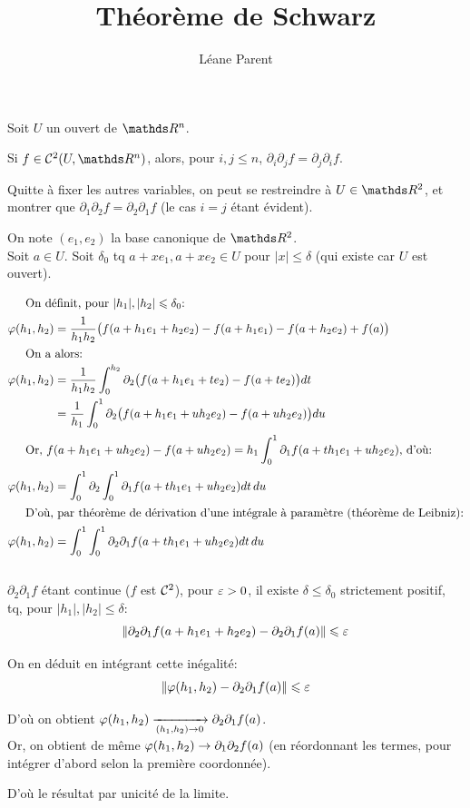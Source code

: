 \documentclass[a4paper, 12pt]{article}
\title{Théorème de Schwarz}
\author{Léane Parent}
\begin{document}
	\maketitle
	
	\begin{pr}
		Soit $U$ un ouvert de $\R^n$.
		
		Si $f \in \Co[2](U, \R^n)$, alors, pour $i, j \leqslant n$, $\partial_i \partial_j f = \partial_j \partial_i f$.
	\end{pr}
	
	Quitte à fixer les autres variables, on peut se restreindre à $U \in \R^2$, et montrer que $\partial_1 \partial_2 f = \partial_2 \partial_1 f$ (le cas $i=j$ étant évident).
	
	On note $(e_1, e_2)$ la base canonique de $\R^2$. \\
	
	Soit $a\in U$. Soit $\delta_0$ tq $a+xe_1, a+xe_2 \in U$ pour $|x| \leqslant \delta$ (qui existe car $U$ est ouvert).
	
	\begin{align*}
		\shortintertext{\indent On définit, pour $|h_1|, |h_2| \leqslant \delta_0$:}
		\vphi(h_1, h_2) &=\frac 1 {h_1h_2} \big( f(a+h_1e_1 + h_2e_2) - f(a+h_1e_1) - f(a+h_2 e_2) + f(a) \big) \\ 
		\shortintertext{\indent On a alors:}
		\vphi(h_1, h_2) & = \frac 1 {h_1 h_2} \int_0^{h_2} \partial_2 \big( f(a+h_1e_1 + te_2) - f(a+te_2)\big) dt \\
		& = \frac 1 {h_1} \int_0^1 \partial_2 \big(f(a+h_1e_1 + uh_2e_2) - f(a+uh_2e_2)\big) du \\
		\shortintertext{\indent Or, $ \displaystyle f(a+h_1e_1 + uh_2e_2) - f(a+uh_2e_2) = h_1 \int_0^1 \partial_1 f(a+th_1e_1 + uh_2e_2)$, d'où:}
		\vphi(h_1, h_2) &= \int_0^1 \partial_2 \int_0^1 \partial_1 f(a+th_1e_1 + uh_2e_2) dt\, du\\
		\shortintertext{\indent D'où, par théorème de dérivation d'une intégrale à paramètre (théorème de Leibniz):}
		\vphi(h_1, h_2) &= \int_0^1 \int_0^1 \partial_2 \partial_1 f(a+th_1e_1 + uh_2e_2) dt\, du
	\end{align*}
	\hfill \\
	
	$\partial_2\partial_1 f$ étant continue ($f$ est $\Co[2]$), pour $\varepsilon > 0$, il existe $\delta \leqslant \delta_0$ strictement positif, tq, pour $|h_1|, |h_2| \leqslant \delta$:
	$$\norm[\partial_2 \partial_1 f(a+h_1e_1 + h_2e_2) - \partial_2 \partial_1 f(a)] \leqslant \eps$$
	
	On en déduit en intégrant cette inégalité:
	$$ \norm[\vphi(h_1, h_2) - \partial_2 \partial_1 f(a)] \leqslant \eps $$
	
	D'où on obtient $ \vphi(h_1, h_2) \cv[(h_1, h_2) \rightarrow 0] \partial_2 \partial_1 f(a) $. \\
	
	Or, on obtient de même $\vphi(h_1, h_2) \cv \partial_1 \partial_2 f(a)$ (en réordonnant les termes, pour intégrer d'abord selon la première coordonnée).
	
	D'où le résultat par unicité de la limite.
	
	\endsq
	
\end{document}

